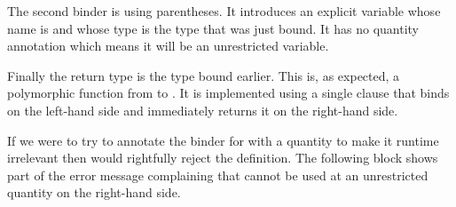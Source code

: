 The second binder is using parentheses. It introduces an explicit variable whose name
is  and whose type is the type  that was just bound. It has
no quantity annotation which means it will be an unrestricted variable.

Finally the return type is the type  bound earlier. This is, as expected,
a polymorphic function from  to . It is implemented using
a single clause that binds  on the left-hand side and immediately returns
it on the right-hand side.


If we were to try to annotate the binder for  with a 
quantity to make it runtime irrelevant then \idris{} would
rightfully reject the definition.
%
The following  block shows part of the error message complaining
that  cannot be used at an unrestricted quantity on the right-hand side.


